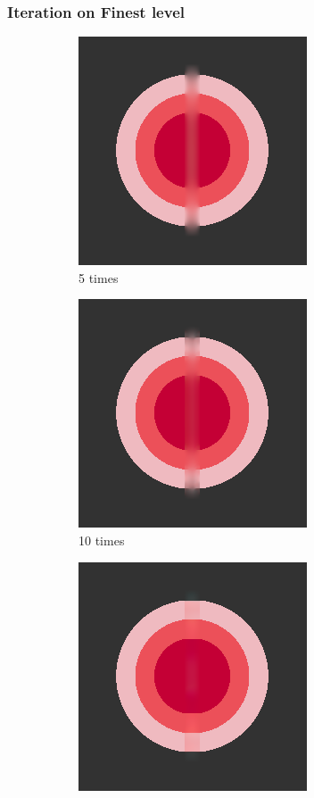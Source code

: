 \documentclass[xcolor=dvipsnames, xetex,serif]{beamer}
\begin{document}
    \begin{frame}
        \frametitle{Iteration on Finest level}
        \begin{figure}[H]
            \centering
            \begin{subfigure}{0.4\linewidth}
                \centering
                \includegraphics[width=0.6\linewidth]{images/just10enough/only5time.png}
                \caption{5 times}
            \end{subfigure}
            \begin{subfigure}{0.4\linewidth}
                \centering
                \includegraphics[width=0.6\linewidth]{images/just10enough/only10time.png}
                \caption{10 times}
            \end{subfigure}
            \begin{subfigure}{0.4\linewidth}
                \centering
                \includegraphics[width=0.6\linewidth]{images/just10enough/only50time.png}			

\end{subfigure}
\end{figure}
\end{frame}
\end{document}
